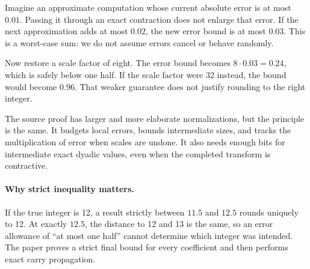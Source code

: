 
Imagine an approximate computation whose current absolute error is at most
$0.01$. Passing it through an exact contraction does not enlarge that error.
If the next approximation adds at most $0.02$, the new error bound is at
most $0.03$. This is a worst-case sum: we do not assume errors cancel or
behave randomly.

Now restore a scale factor of eight. The error bound becomes
$8\cdot0.03=0.24$, which is safely below one half. If the scale factor
were 32 instead, the bound would become $0.96$. That weaker guarantee does
not justify rounding to the right integer.


The source proof has larger and more elaborate normalizations, but the
principle is the same. It budgets local errors, bounds intermediate sizes,
and tracks the multiplication of error when scales are undone. It also
needs enough bits for intermediate exact dyadic values, even when the
completed transform is contractive.

\paragraph{Why strict inequality matters.}
If the true integer is 12, a result strictly between $11.5$ and $12.5$
rounds uniquely to 12. At exactly $12.5$, the distance to 12 and 13 is the
same, so an error allowance of ``at most one half'' cannot determine which
integer was intended. The paper proves a strict final bound for every
coefficient and then performs exact carry propagation.

